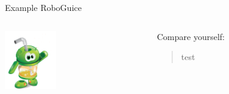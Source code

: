 \documentclass[aspectratio=169]{beamer}
\begin{document}
    \begin{frame}{Example RoboGuice}
      \begin{columns}[t]
        \begin{column}{0.2\textwidth}
          \begin{center}
            \includegraphics[height=1.0in]{roboguice.png}
          \end{center}
        \end{column}

       \begin{column}{0.8\textwidth}
Compare yourself:
\begin{quotation}
 test
\end{quotation}



%  



        \end{column}
      \end{columns}
    \end{frame}
  
\end{document}
